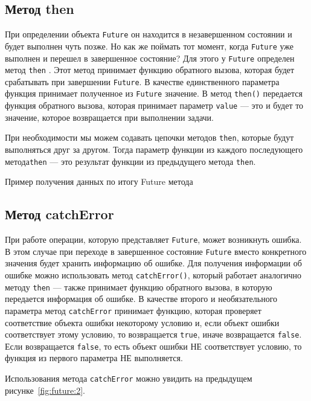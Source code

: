 \subsection{Метод then}

При определении объекта \texttt{Future}
он находится в незавершенном состоянии и будет выполнен чуть позже.
Но как же поймать тот момент,
когда \texttt{Future} уже выполнен и перешел в завершенное состояние?
Для этого у \texttt{Future} определен метод \texttt{then} .
Этот метод принимает функцию обратного вызова, которая будет срабатывать
при завершении \texttt{Future}.
В качестве единственного параметра функция принимает полученное
из \texttt{Future} значение.
В метод \texttt{then()} передается функция обратного вызова,
которая принимает параметр \texttt{value} --- это и будет то значение,
которое возвращается при выполнении задачи.\par
При необходимости мы можем содавать цепочки методов \texttt{then},
которые будут выполняться друг за другом.
Тогда параметр функции из каждого последующего метода\texttt{then} 
--- это результат функции из предыдущего метода \texttt{then}.

\begin{image}
	\caption{Пример получения данных по итогу Future метода}
	\label{fig:future:2}
\end{image}

\subsection{Метод catchError}

При работе операции, которую представляет \texttt{Future},
может возникнуть ошибка.
В этом случае при переходе в завершенное состояние \texttt{Future}
вместо конкретного значения будет хранить информацию об ошибке.
Для получения информации об ошибке можно использовать
метод \texttt{catchError()}, который работает аналогично методу
\texttt{then} --- также принимает функцию обратного вызова,
в которую передается информация об ошибке.
В качестве второго
и необязательного параметра метод \texttt{catchError} принимает функцию,
которая проверяет соответствие объекта ошибки некоторому условию и,
если объект ошибки соответствует этому условию,
то возвращается \texttt{true}, иначе возвращается \texttt{false}.
Если возвращается \texttt{false},
то есть объект ошибки НЕ соответствует условию,
то функция из первого параметра НЕ выполняется.\par
Использования метода \texttt{catchError} можно увидить на 
предыдущем рисунке~\ref{fig:future:2}.

